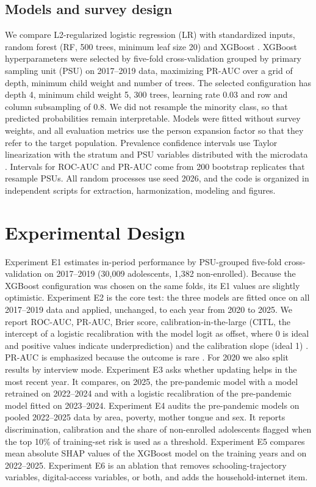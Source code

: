\documentclass[conference]{IEEEtran}
\begin{document}
\subsection{Models and survey design}
We compare L2-regularized logistic regression (LR) with standardized inputs, random forest (RF, 500 trees, minimum leaf size 20) \cite{breiman2001} and XGBoost \cite{chen2016}. XGBoost hyperparameters were selected by five-fold cross-validation grouped by primary sampling unit (PSU) on 2017--2019 data, maximizing PR-AUC over a grid of depth, minimum child weight and number of trees. The selected configuration has depth 4, minimum child weight 5, 300 trees, learning rate 0.03 and row and column subsampling of 0.8. We did not resample the minority class, so that predicted probabilities remain interpretable. Models were fitted without survey weights, and all evaluation metrics use the person expansion factor so that they refer to the target population. Prevalence confidence intervals use Taylor linearization with the stratum and PSU variables distributed with the microdata \cite{lumley2004}. Intervals for ROC-AUC and PR-AUC come from 200 bootstrap replicates that resample PSUs. All random processes use seed 2026, and the code is organized in independent scripts for extraction, harmonization, modeling and figures.

\section{Experimental Design}

Experiment E1 estimates in-period performance by PSU-grouped five-fold cross-validation on 2017--2019 (30,009 adolescents, 1,382 non-enrolled). Because the XGBoost configuration was chosen on the same folds, its E1 values are slightly optimistic. Experiment E2 is the core test: the three models are fitted once on all 2017--2019 data and applied, unchanged, to each year from 2020 to 2025. We report ROC-AUC, PR-AUC, Brier score, calibration-in-the-large (CITL, the intercept of a logistic recalibration with the model logit as offset, where 0 is ideal and positive values indicate underprediction) and the calibration slope (ideal 1) \cite{vancalster2019}. PR-AUC is emphasized because the outcome is rare \cite{saito2015}. For 2020 we also split results by interview mode. Experiment E3 asks whether updating helps in the most recent year. It compares, on 2025, the pre-pandemic model with a model retrained on 2022--2024 and with a logistic recalibration of the pre-pandemic model fitted on 2023--2024. Experiment E4 audits the pre-pandemic models on pooled 2022--2025 data by area, poverty, mother tongue and sex. It reports discrimination, calibration and the share of non-enrolled adolescents flagged when the top 10\% of training-set risk is used as a threshold. Experiment E5 compares mean absolute SHAP values \cite{lundberg2017,lundberg2020} of the XGBoost model on the training years and on 2022--2025. Experiment E6 is an ablation that removes schooling-trajectory variables, digital-access variables, or both, and adds the household-internet item.
\end{document}
